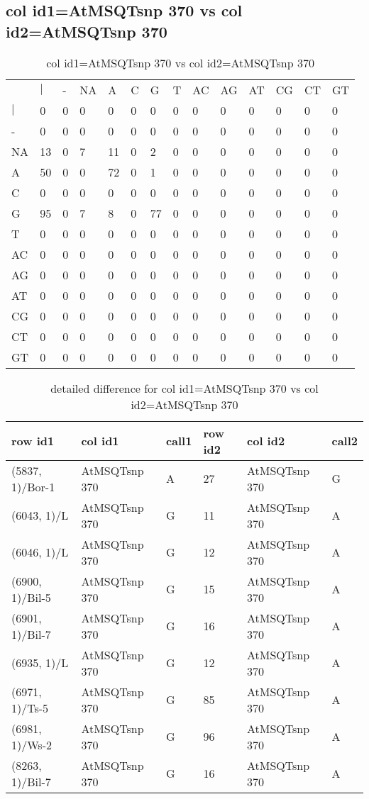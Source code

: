 \subsection{col id1=AtMSQTsnp 370 vs col id2=AtMSQTsnp 370}
\begin{center}
\begin{longtable}{|l|l|l|l|l|l|l|l|l|l|l|l|l|l|}
\caption{col id1=AtMSQTsnp 370 vs col id2=AtMSQTsnp 370} \label{table_dm888}\\
\hline
\\
\hline
&$|$&-&NA&A&C&G&T&AC&AG&AT&CG&CT&GT\\
$|$&0&0&0&0&0&0&0&0&0&0&0&0&0\\
-&0&0&0&0&0&0&0&0&0&0&0&0&0\\
NA&13&0&7&11&0&2&0&0&0&0&0&0&0\\
A&50&0&0&72&0&1&0&0&0&0&0&0&0\\
C&0&0&0&0&0&0&0&0&0&0&0&0&0\\
G&95&0&7&8&0&77&0&0&0&0&0&0&0\\
T&0&0&0&0&0&0&0&0&0&0&0&0&0\\
AC&0&0&0&0&0&0&0&0&0&0&0&0&0\\
AG&0&0&0&0&0&0&0&0&0&0&0&0&0\\
AT&0&0&0&0&0&0&0&0&0&0&0&0&0\\
CG&0&0&0&0&0&0&0&0&0&0&0&0&0\\
CT&0&0&0&0&0&0&0&0&0&0&0&0&0\\
GT&0&0&0&0&0&0&0&0&0&0&0&0&0\\
\hline
\end{longtable}
\end{center}

\begin{center}
\begin{longtable}{|l|l|l|l|l|l|}
\caption{detailed difference for col id1=AtMSQTsnp 370 vs col id2=AtMSQTsnp 370} \label{table_dm889}\\
\hline
row id1&col id1&call1&row id2&col id2&call2\\
\hline
(5837, 1)/Bor-1&AtMSQTsnp 370&A&27&AtMSQTsnp 370&G\\
(6043, 1)/L&AtMSQTsnp 370&G&11&AtMSQTsnp 370&A\\
(6046, 1)/L&AtMSQTsnp 370&G&12&AtMSQTsnp 370&A\\
(6900, 1)/Bil-5&AtMSQTsnp 370&G&15&AtMSQTsnp 370&A\\
(6901, 1)/Bil-7&AtMSQTsnp 370&G&16&AtMSQTsnp 370&A\\
(6935, 1)/L&AtMSQTsnp 370&G&12&AtMSQTsnp 370&A\\
(6971, 1)/Ts-5&AtMSQTsnp 370&G&85&AtMSQTsnp 370&A\\
(6981, 1)/Ws-2&AtMSQTsnp 370&G&96&AtMSQTsnp 370&A\\
(8263, 1)/Bil-7&AtMSQTsnp 370&G&16&AtMSQTsnp 370&A\\
\hline
\end{longtable}
\end{center}

